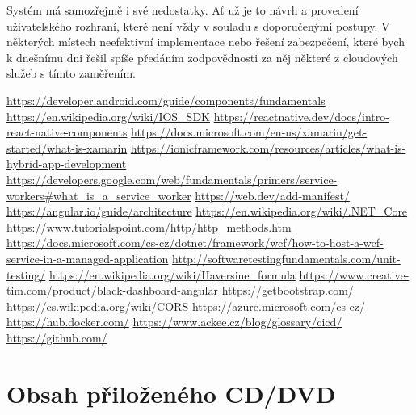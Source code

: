 \documentclass[
  biblatex,
  glossaries,
  index
]{kidiplom}
\begin{document}
Systém má samozřejmě i své nedostatky. Ať už je to návrh a provedení uživatelského rozhraní, které není vždy v souladu s doporučenými postupy. V některých místech neefektivní implementace nebo řešení zabezpečení, které bych k dnešnímu dni řešil spíše předáním zodpovědnosti za něj některé z cloudových služeb s tímto zaměřením. 

\begin{thebibliography}{9}
     \url{https://developer.android.com/guide/components/fundamentals}
     \url{https://en.wikipedia.org/wiki/IOS\_SDK}
     \url{https://reactnative.dev/docs/intro-react-native-components}
     \url{https://docs.microsoft.com/en-us/xamarin/get-started/what-is-xamarin}
     \url{https://ionicframework.com/resources/articles/what-is-hybrid-app-development}
     \url{https://developers.google.com/web/fundamentals/primers/service-workers\#what\_is\_a\_service\_worker}
     \url{https://web.dev/add-manifest/}
     \url{https://angular.io/guide/architecture}
     \url{https://en.wikipedia.org/wiki/.NET\_Core}
     \url{https://www.tutorialspoint.com/http/http\_methods.htm}
     \url{https://docs.microsoft.com/cs-cz/dotnet/framework/wcf/how-to-host-a-wcf-service-in-a-managed-application}
     \url{http://softwaretestingfundamentals.com/unit-testing/}
     \url{https://en.wikipedia.org/wiki/Haversine\_formula}
     \url{https://www.creative-tim.com/product/black-dashboard-angular}
     \url{https://getbootstrap.com/}
     \url{https://cs.wikipedia.org/wiki/CORS}
     \url{https://azure.microsoft.com/cs-cz/}
     \url{https://hub.docker.com/}
     \url{https://www.ackee.cz/blog/glossary/cicd/}
     \url{https://github.com/}
\end{thebibliography}


\newpage
\section{Obsah přiloženého CD/DVD} \label{sec:ObsahCD}
\end{document}
